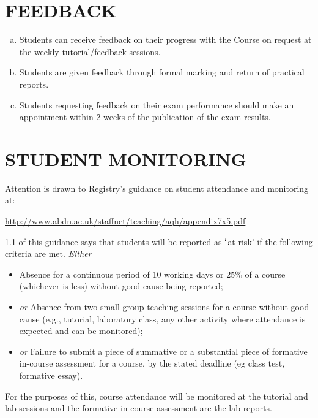 \documentclass[12pts,a4paper,amsmath,amssymb,floatfix]{article}%
\begin{document}
\section{FEEDBACK}
\begin{enumerate}[(a)]
\item Students can receive feedback on their progress with the Course on request at the weekly tutorial/feedback sessions.
\item Students are given feedback through formal marking and return of practical reports.
\item Students requesting feedback on their exam performance should make an appointment within 2 weeks of the publication of the exam results.
\end{enumerate}


\section{STUDENT MONITORING}
Attention is drawn to Registry's guidance on student attendance and monitoring at:
\begin{center}
\href{http://www.abdn.ac.uk/staffnet/teaching/aqh/appendix7x5.pdf}{http://www.abdn.ac.uk/staffnet/teaching/aqh/appendix7x5.pdf}
\end{center}
1.1 of this guidance says that students will be reported as $\lq$at risk' if the following criteria are met. {\it Either}
\begin{itemize}
\item Absence for a continuous period of 10 working days or 25$\%$ of a course (whichever is less) without good cause being reported;
\item {\it or} Absence from two small group teaching sessions for a course without good cause (e.g., tutorial, laboratory class, any other activity where attendance is  expected and can be monitored);
\item {\it or} Failure to submit a piece of summative or a substantial piece of formative in-course assessment for a course, by the stated deadline (eg class test, formative essay).
\end{itemize}
For the purposes of this, course attendance will be monitored at the tutorial and lab sessions and the formative in-course assessment are the lab reports.
\end{document}
